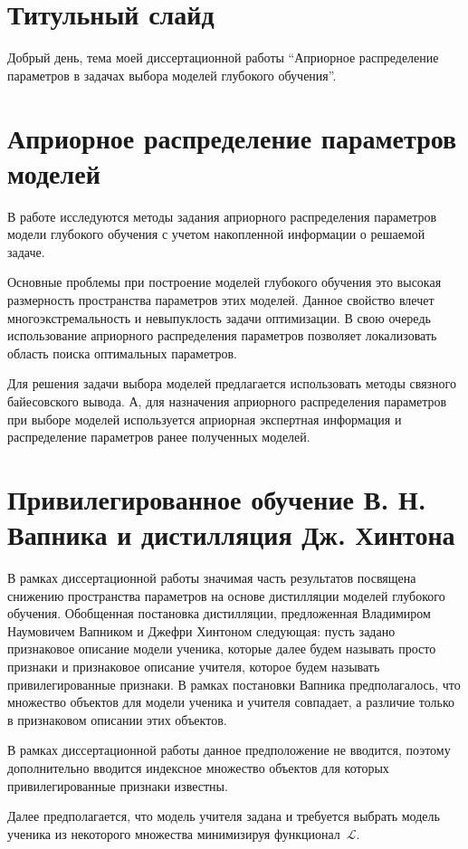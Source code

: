 \documentclass[10pt, twoside]{article}
\begin{document}
\section{Титульный слайд}
Добрый день, тема моей диссертационной работы ``Априорное распределение параметров в задачах выбора моделей глубокого обучения''.

\section{Априорное распределение параметров моделей}
В работе исследуются методы задания априорного распределения параметров модели глубокого обучения с учетом накопленной информации о решаемой задаче.

Основные проблемы при построение моделей глубокого обучения это высокая размерность пространства параметров этих моделей. Данное свойство влечет многоэкстремальность и невыпуклость задачи оптимизации. В свою очередь использование априорного распределения параметров позволяет локализовать область поиска оптимальных параметров.

Для решения задачи выбора моделей предлагается использовать методы связного байесовского вывода. А, для назначения априорного распределения параметров при выборе моделей используется априорная экспертная информация и распределение параметров ранее полученных моделей.

\section{Привилегированное обучение В. Н. Вапника и дистилляция Дж. Хинтона}
В рамках диссертационной работы значимая часть результатов посвящена снижению пространства параметров на основе дистилляции моделей глубокого обучения.
Обобщенная постановка дистилляции, предложенная Владимиром Наумовичем Вапником и Джефри Хинтоном следующая: пусть задано признаковое описание модели ученика, которые далее будем называть просто признаки и признаковое описание учителя, которое будем называть привилегированные признаки. В рамках постановки Вапника предполагалось, что множество объектов для модели ученика и учителя совпадает, а различие только в признаковом описании этих объектов.

В рамках диссертационной работы данное предположение не вводится, поэтому дополнительно вводится индексное множество объектов для которых привилегированные признаки известны.

Далее предполагается, что модель учителя задана и требуется выбрать модель ученика из некоторого множества минимизируя функционал~$\mathcal{L}$.
\end{document}
